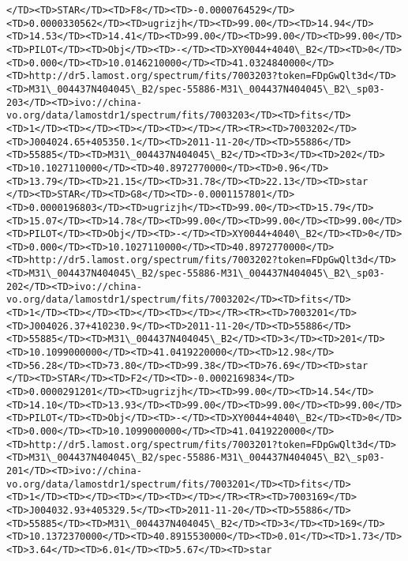 \documentclass[11pt]{article}
\begin{document}
\begin{Verbatim}[commandchars=\\\{\}]
</TD><TD>STAR</TD><TD>F8</TD><TD>-0.0000764529</TD><TD>0.0000330562</TD><TD>ugrizjh</TD><TD>99.00</TD><TD>14.94</TD><TD>14.53</TD><TD>14.41</TD><TD>99.00</TD><TD>99.00</TD><TD>99.00</TD><TD>PILOT</TD><TD>Obj</TD><TD>-</TD><TD>XY0044+4040\_B2</TD><TD>0</TD><TD>0.000</TD><TD>10.0146210000</TD><TD>41.0324840000</TD><TD>http://dr5.lamost.org/spectrum/fits/7003203?token=FDpGwQlt3d</TD><TD>M31\_004437N404045\_B2/spec-55886-M31\_004437N404045\_B2\_sp03-203</TD><TD>ivo://china-vo.org/data/lamostdr1/spectrum/fits/7003203</TD><TD>fits</TD><TD>1</TD><TD></TD><TD></TD><TD></TD></TR><TR><TD>7003202</TD><TD>J004024.65+405350.1</TD><TD>2011-11-20</TD><TD>55886</TD><TD>55885</TD><TD>M31\_004437N404045\_B2</TD><TD>3</TD><TD>202</TD><TD>10.1027110000</TD><TD>40.8972770000</TD><TD>0.96</TD><TD>13.79</TD><TD>21.15</TD><TD>31.78</TD><TD>22.13</TD><TD>star     </TD><TD>STAR</TD><TD>G8</TD><TD>-0.0001157801</TD><TD>0.0000196803</TD><TD>ugrizjh</TD><TD>99.00</TD><TD>15.79</TD><TD>15.07</TD><TD>14.78</TD><TD>99.00</TD><TD>99.00</TD><TD>99.00</TD><TD>PILOT</TD><TD>Obj</TD><TD>-</TD><TD>XY0044+4040\_B2</TD><TD>0</TD><TD>0.000</TD><TD>10.1027110000</TD><TD>40.8972770000</TD><TD>http://dr5.lamost.org/spectrum/fits/7003202?token=FDpGwQlt3d</TD><TD>M31\_004437N404045\_B2/spec-55886-M31\_004437N404045\_B2\_sp03-202</TD><TD>ivo://china-vo.org/data/lamostdr1/spectrum/fits/7003202</TD><TD>fits</TD><TD>1</TD><TD></TD><TD></TD><TD></TD></TR><TR><TD>7003201</TD><TD>J004026.37+410230.9</TD><TD>2011-11-20</TD><TD>55886</TD><TD>55885</TD><TD>M31\_004437N404045\_B2</TD><TD>3</TD><TD>201</TD><TD>10.1099000000</TD><TD>41.0419220000</TD><TD>12.98</TD><TD>56.28</TD><TD>73.80</TD><TD>99.38</TD><TD>76.69</TD><TD>star     </TD><TD>STAR</TD><TD>F2</TD><TD>-0.0002169834</TD><TD>0.0000291201</TD><TD>ugrizjh</TD><TD>99.00</TD><TD>14.54</TD><TD>14.10</TD><TD>13.93</TD><TD>99.00</TD><TD>99.00</TD><TD>99.00</TD><TD>PILOT</TD><TD>Obj</TD><TD>-</TD><TD>XY0044+4040\_B2</TD><TD>0</TD><TD>0.000</TD><TD>10.1099000000</TD><TD>41.0419220000</TD><TD>http://dr5.lamost.org/spectrum/fits/7003201?token=FDpGwQlt3d</TD><TD>M31\_004437N404045\_B2/spec-55886-M31\_004437N404045\_B2\_sp03-201</TD><TD>ivo://china-vo.org/data/lamostdr1/spectrum/fits/7003201</TD><TD>fits</TD><TD>1</TD><TD></TD><TD></TD><TD></TD></TR><TR><TD>7003169</TD><TD>J004032.93+405329.5</TD><TD>2011-11-20</TD><TD>55886</TD><TD>55885</TD><TD>M31\_004437N404045\_B2</TD><TD>3</TD><TD>169</TD><TD>10.1372370000</TD><TD>40.8915530000</TD><TD>0.01</TD><TD>1.73</TD><TD>3.64</TD><TD>6.01</TD><TD>5.67</TD><TD>star     
\end{Verbatim}
\end{document}
